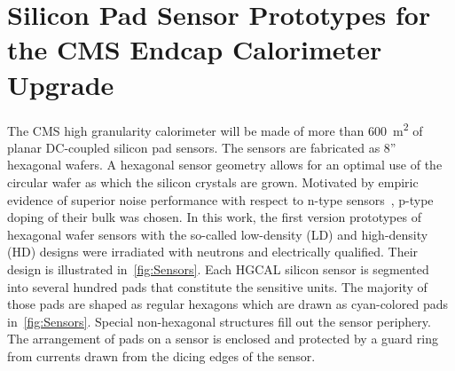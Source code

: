 \section{Silicon Pad Sensor Prototypes for the CMS Endcap Calorimeter Upgrade}
\label{sec:sensors}

The CMS high granularity calorimeter will be made of more than \SI{600}{\metre\squared} of planar DC-coupled silicon pad sensors.
The sensors are fabricated as 8'' hexagonal wafers.
A hexagonal sensor geometry allows for an optimal use of the circular wafer as which the silicon crystals are grown.
Motivated by empiric evidence of superior noise performance with respect to n-type sensors~\cite{Adam_2017}, p-type doping of their bulk was chosen.\newline
In this work, the first version prototypes of hexagonal wafer sensors with the so-called low-density (LD) and high-density (HD) designs were irradiated with neutrons and electrically qualified.
Their design is illustrated in~\ref{fig:Sensors}.
Each HGCAL silicon sensor is segmented into several hundred pads that constitute the sensitive units. 
The majority of those pads are shaped as regular hexagons which are drawn as cyan-colored pads in~\ref{fig:Sensors}.
Special non-hexagonal structures fill out the sensor periphery.
The arrangement of pads on a sensor is enclosed and protected by a guard ring from currents drawn from the dicing edges of the sensor.
